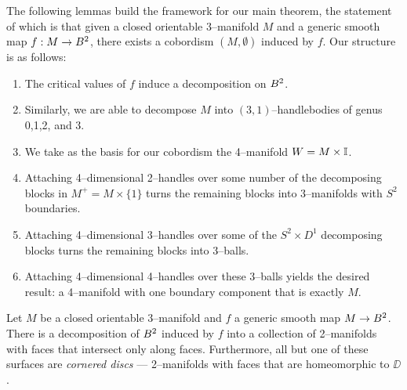The following lemmas build the framework for our main theorem, the statement of which is that given a closed orientable 3--manifold $M$ and a generic smooth map $f:M\to B^2$, there exists a cobordism $(M,\emptyset)$ induced by $f$.
Our structure is as follows:
\begin{enumerate}
	\item
		The critical values of $f$ induce a decomposition on $B^2$.
		
	\item
		Similarly, we are able to decompose $M$ into $(3,1)$--handlebodies of genus 0,1,2, and 3.
		
	\item
		We take as the basis for our cobordism the 4--manifold $W=M\times\mathbb{I}$.
		
	\item
		Attaching 4--dimensional 2--handles over some number of the decomposing blocks in $M^+=M\times\{1\}$ turns the remaining blocks into 3--manifolds with $S^2$ boundaries.
		
	\item
		Attaching 4--dimensional 3--handles over some of the $S^2\times D^1$ decomposing blocks turns the remaining blocks into 3--balls.
		
	\item
		Attaching 4--dimensional 4--handles over these 3--balls yields the desired result: a 4--manifold with one boundary component that is exactly $M$.	
\end{enumerate}


\begin{lem}
	\label{lem:bbdecomp}
	Let $M$ be a closed orientable 3--manifold and $f$ a generic smooth map $M\to B^2$.
	There is a decomposition of $B^2$ induced by $f$ into a collection of 2--manifolds with faces that intersect only along faces.
	Furthermore, all but one of these surfaces are \emph{cornered discs} --- 2--manifolds with faces that are homeomorphic to $\DD$.
\end{lem}

